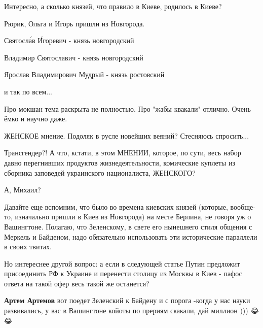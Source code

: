 \begin{itemize}
Интересно, а сколько князей, что правило в Киеве, родилось в Киеве?

Рюрик, Ольга и Игорь пришли из Новгорода.

Святосла́в И́горевич - князь новгородский

Владимир Святославич - князь новгородский

Ярослав Владимирович Мудрый - князь ростовский

и так по всем...


Про мокшан тема раскрыта не полностью. Про "жабы квакали" отлично. Очень ёмко и
научно даже.


ЖЕНСКОЕ мнение. Подоляк в русле новейших веяний? Стесняюсь спросить...

Трансгендер?! А что, кстати, в этом МНЕНИИ, которое, по сути, весь набор давно
перегнивших продуктов жизнедеятельности, комические куплеты из сборника
заповедей украинского националиста, ЖЕНСКОГО? 

А, Михаил?


Давайте еще вспомним, что было во времена киевских князей (которые, вообще-то,
изначально пришли в Киев из Новгорода) на месте Берлина, не говоря уж о
Вашингтоне. Полагаю, что Зеленскому, в свете его нынешнего стиля общения с
Меркель и Байденом, надо обязательно использовать эти исторические параллели в
своих твитах.

Но интереснее другой вопрос: а если в следующей статье Путин предложит
присоединить РФ к Украине и перенести столицу из Москвы в Киев - пафос ответа
на такой офер весь такой же останется?

\begin{itemize}
%
%
 
\textbf{Артем Артемов} вот поедет Зеленский к Байдену и с порога -когда у нас науки развивались, у вас в Вашингтоне койоты по прериям скакали, дай миллион ))) 😂😂
\end{itemize}

 

\end{itemize}
